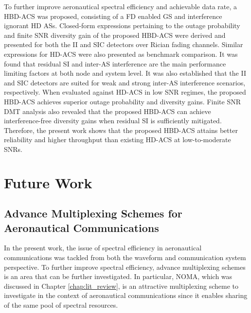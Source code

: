 To further improve aeronautical spectral efficiency and achievable data rate, a HBD-ACS was proposed, consisting of a FD enabled GS and interference ignorant HD ASs. Closed-form expressions pertaining to the outage probability and finite SNR diversity gain of the proposed HBD-ACS were derived and presented for both the II and SIC detectors over Rician fading channels. Similar expressions for HD-ACS were also presented as benchmark comparison. It was found that residual SI and inter-AS interference are the main performance limiting factors at both node and system level. It was also established that the II and SIC detectors are suited for weak and strong inter-AS interference scenarios, respectively. When evaluated against HD-ACS in low SNR regimes, the proposed HBD-ACS achieves superior outage probability and diversity gains. Finite SNR DMT analysis also revealed that the proposed HBD-ACS can achieve interference-free diversity gains when residual SI is sufficiently mitigated. Therefore, the present work shows that the proposed HBD-ACS attains better reliability and higher throughput than existing HD-ACS at low-to-moderate SNRs.

\section{Future Work}

\subsection{Advance Multiplexing Schemes for Aeronautical Communications}
In the present work, the issue of spectral efficiency in aeronautical communications was tackled from both the waveform and communication system perspective. To further improve spectral efficiency, advance multiplexing schemes is an area that can be further investigated. In particular, NOMA, which was discussed in Chapter \ref{chap:lit_review}, is an attractive multiplexing scheme to investigate in the context of aeronautical communications since it enables sharing of the same pool of spectral resources.

